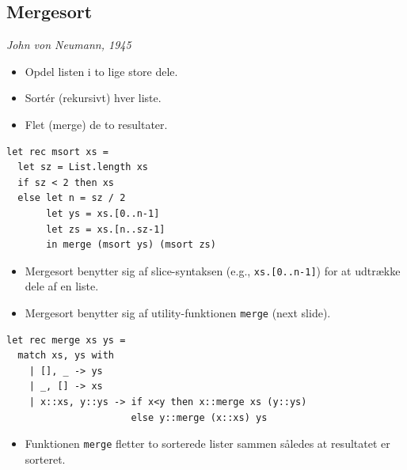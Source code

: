 \documentclass[rgb]{beamer}
\begin{document}
\subsection{Mergesort}
\begin{frame}[fragile]
\begin{footnotesize}


  \emph{John von Neumann, 1945}

  \begin{itemize}
  \item Opdel listen i to lige store dele.
  \item Sort\'er (rekursivt) hver liste.
  \item Flet (merge) de to resultater.
  \end{itemize}


\begin{lstlisting}[numbers=none,frame=none,mathescape]
let rec msort xs =
  let sz = List.length xs
  if sz < 2 then xs
  else let n = sz / 2
       let ys = xs.[0..n-1]
       let zs = xs.[n..sz-1]
       in merge (msort ys) (msort zs)
\end{lstlisting}

\begin{itemize}
\item Mergesort benytter sig af slice-syntaksen (e.g., \lstinline{xs.[0..n-1]}) for at udtrække dele af en liste.
\item Mergesort benytter sig af utility-funktionen \lstinline{merge} (next slide).
\end{itemize}
\end{footnotesize}
\end{frame}

\begin{frame}[fragile]
\begin{footnotesize}

\vspace{1ex}

\begin{lstlisting}[numbers=none,frame=none,mathescape]
let rec merge xs ys =
  match xs, ys with
    | [], _ -> ys
    | _, [] -> xs
    | x::xs, y::ys -> if x<y then x::merge xs (y::ys)
                      else y::merge (x::xs) ys
\end{lstlisting}

\begin{itemize}
\item Funktionen \lstinline{merge} fletter to sorterede lister sammen således at resultatet er sorteret.
\end{itemize}

\end{footnotesize}
\end{frame}
\end{document}

